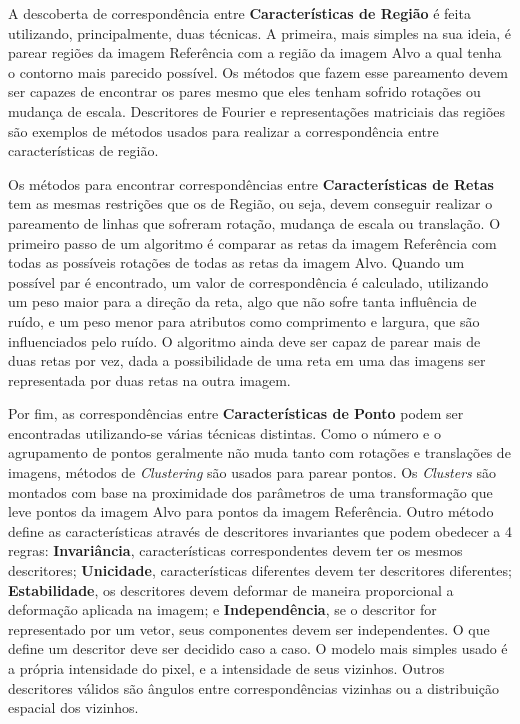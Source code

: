     A descoberta de correspondência entre \textbf{Características de Região} é feita utilizando, principalmente, duas 
técnicas. A primeira, mais simples na sua ideia, é parear regiões da imagem Referência com a região da imagem Alvo a 
qual tenha o contorno mais parecido possível. Os métodos que fazem esse pareamento devem ser capazes de encontrar os 
pares mesmo que eles tenham sofrido rotações ou mudança de escala. Descritores de Fourier e representações matriciais 
das regiões são exemplos de métodos usados para realizar a correspondência entre características de região.

    Os métodos para encontrar correspondências entre \textbf{Características de Retas} tem as mesmas restrições que os
de Região, ou seja, devem conseguir realizar o pareamento de linhas que sofreram rotação, mudança de escala ou 
translação. O primeiro passo de um algoritmo é comparar as retas da imagem Referência com todas as possíveis rotações 
de todas as retas da imagem Alvo. Quando um possível par é encontrado, um valor de correspondência é calculado, 
utilizando um peso maior para a direção da reta, algo que não sofre tanta influência de ruído, e um peso menor para 
atributos como comprimento e largura, que são influenciados pelo ruído. O algoritmo ainda deve ser capaz de parear mais 
de duas retas por vez, dada a possibilidade de uma reta em uma das imagens ser representada por duas retas na outra 
imagem.

    Por fim, as correspondências entre \textbf{Características de Ponto} podem ser encontradas utilizando-se várias 
técnicas distintas. Como o número e o agrupamento de pontos geralmente não muda tanto com rotações e translações de 
imagens, métodos de \textit{Clustering} são usados para parear pontos. Os \textit{Clusters} são montados com base na 
proximidade dos parâmetros de uma transformação que leve pontos da imagem Alvo para pontos da imagem Referência. Outro 
método define as características através de descritores invariantes que podem obedecer a 4 regras: \textbf{Invariância}, 
características correspondentes devem ter os mesmos descritores; \textbf{Unicidade}, características diferentes devem 
ter descritores diferentes; \textbf{Estabilidade}, os descritores devem deformar de maneira proporcional a deformação
aplicada na imagem; e \textbf{Independência}, se o descritor for representado por um vetor, seus componentes devem ser 
independentes. O que define um descritor deve ser decidido caso a caso. O modelo mais simples usado é a própria 
intensidade do pixel, e a intensidade de seus vizinhos. Outros descritores válidos são ângulos entre correspondências 
vizinhas ou a distribuição espacial dos vizinhos.

